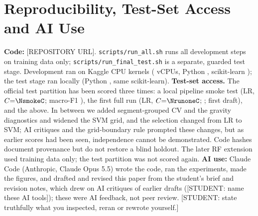 \documentclass{article}
\begin{document}
\section{Reproducibility, Test-Set Access and AI Use}
\label{sec:repro}
\textbf{Code:} [REPOSITORY URL]. \texttt{scripts/run\_all.sh} runs all development steps on training data only; \texttt{scripts/run\_final\_test.sh} is a separate, guarded test stage. Development ran on Kaggle CPU kernels (\Nncpu{} vCPUs, Python \Npyver, scikit-learn \Nsklearn); the test stage ran locally (Python \Npyvertest, same scikit-learn).
\textbf{Test-set access.} The official test partition has been scored three times: a local pipeline smoke test (LR, $C{=}\NsmokeC$; macro-F1 \Nsmoketestf), the first full run (LR, $C{=}\NrunoneC$; \Nrunonetestf; first draft), and the \Nselmodel{} above. In between we added segment-grouped CV and the gravity diagnostics and widened the SVM grid, and the selection changed from LR to SVM; AI critiques and the grid-boundary rule prompted these changes, but as earlier scores had been seen, independence cannot be demonstrated. Code hashes document provenance but do not restore a blind holdout. The later RF extension used training data only; the test partition was not scored again.
\textbf{AI use:} Claude Code (Anthropic, Claude Opus 5.5) wrote the code, ran the experiments, made the figures, and drafted and revised this paper from the student's brief and revision notes, which drew on AI critiques of earlier drafts ([STUDENT: name these AI tools]); these were AI feedback, not peer review. [STUDENT: state truthfully what you inspected, reran or rewrote yourself.]
\end{document}
